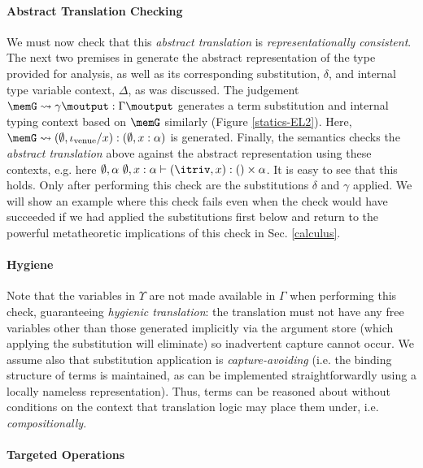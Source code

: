 \paragraph{Abstract Translation Checking} We must now check that this \emph{abstract translation} is \emph{representationally consistent}. The next two premises in  generate the abstract representation of the type provided for analysis, as well as its corresponding substitution, $\delta$, and internal type variable context, $\Delta$, as was discussed. The judgement $\memG \leadsto \gamma\moutput : \Gamma\moutput$ generates a term substitution and internal typing context based on $\memG$ similarly (Figure \ref{statics-EL2}). Here, $\memG \leadsto (\emptyset, \iota_\text{venue}/x) : (\emptyset, x : \alpha)$ is generated. Finally, the semantics checks the \emph{abstract translation} above against the abstract representation using these contexts, e.g. here $\emptyset, \alpha~\emptyset, x : \alpha \vdash \ipair{\itriv}{x} : \iunit \times \alpha$. It is easy to see that this holds. Only after performing this check are the substitutions $\delta$ and $\gamma$ applied. We will  show an example where this check fails even when the check would have succeeded if we had applied the substitutions first below  and return to the powerful metatheoretic implications of this check in Sec. \ref{calculus}.

\paragraph{Hygiene} Note that the variables in $\Upsilon$ are not made available in $\Gamma$ when performing this check, guaranteeing \emph{hygienic translation}: the translation must not have any free variables other than those generated implicitly via the argument store (which applying the  substitution will eliminate) so inadvertent capture cannot occur. We assume also that substitution application is \emph{capture-avoiding} (i.e. the binding structure of terms is maintained, as can be implemented straightforwardly using a locally nameless representation). Thus, terms can be reasoned about without conditions on the context that translation logic may place them under, i.e. \emph{compositionally}.

\paragraph{Targeted Operations} 




